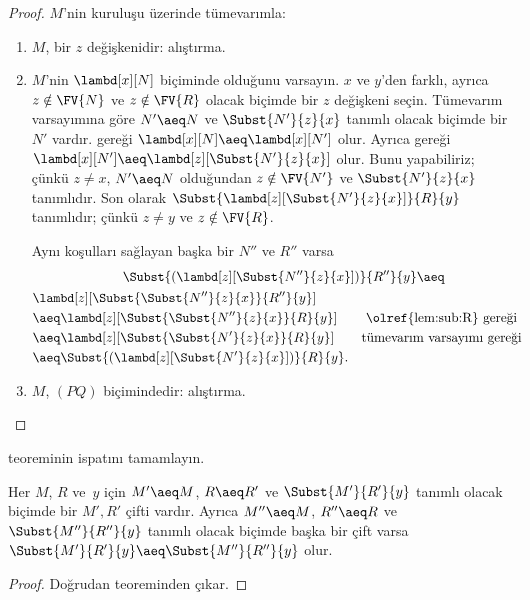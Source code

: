 \begin{proof}
  $M$'nin kuruluşu üzerinde tümevarımla:
  \begin{enumerate}
  \item $M$, bir $z$ değişkenidir: alıştırma.
  \item $M$'nin $\lambd[x][N]$ biçiminde olduğunu varsayın. $x$ ve $y$'den
    farklı, ayrıca $z\notin\FV{N}$ ve $z\notin\FV{R}$ olacak biçimde bir
    $z$ değişkeni seçin. Tümevarım varsayımına göre $N'\aeq N$ ve
    $\Subst{N'}{z}{x}$ tanımlı olacak biçimde bir $N'$ vardır.
     gereği
    $\lambd[x][N]\aeq\lambd[x][N']$ olur. Ayrıca
     gereği
    $\lambd[x][N']\aeq\lambd[z][\Subst{N'}{z}{x}]$ olur. Bunu yapabiliriz;
    çünkü $z\neq x$, $N'\aeq N$ olduğundan $z\notin\FV{N'}$ ve
    $\Subst{N'}{z}{x}$ tanımlıdır. Son olarak
    $\Subst{\lambd[z][\Subst{N'}{z}{x}]}{R}{y}$ tanımlıdır; çünkü
    $z\neq y$ ve $z\notin\FV{R}$.

    Aynı koşulları sağlayan başka bir $N''$ ve $R''$ varsa
    \begin{multline*}
      \Subst{(\lambd[z][\Subst{N''}{z}{x}])}{R''}{y} \aeq\\
    \begin{aligned}
      &\lambd[z][\Subst{\Subst{N''}{z}{x}}{R''}{y}] \\
      &\aeq \lambd[z][\Subst{\Subst{N''}{z}{x}}{R}{y}] && \text{
        \olref{lem:sub:R} gereği}\\
      &\aeq\lambd[z][\Subst{\Subst{N'}{z}{x}}{R}{y}]
      && \text{tümevarım varsayımı gereği}\\
      &\aeq\Subst{(\lambd[z][\Subst{N'}{z}{x}])}{R}{y}.
    \end{aligned}
    \end{multline*}
    \item $M$, $(PQ)$ biçimindedir: alıştırma.
  \end{enumerate}
\end{proof}

\begin{prob}
   teoreminin ispatını tamamlayın.
\end{prob}

\begin{cor}
  Her $M$, $R$ ve~$y$ için $M'\aeq M$, $R\aeq R'$ ve
  $\Subst{M'}{R'}{y}$ tanımlı olacak biçimde bir $M',R'$ çifti vardır.
  Ayrıca $M''\aeq M$, $R''\aeq R$ ve $\Subst{M''}{R''}{y}$ tanımlı olacak
  biçimde başka bir çift varsa
  $\Subst{M'}{R'}{y}\aeq\Subst{M''}{R''}{y}$ olur.
\end{cor}

\begin{proof}
  Doğrudan  teoreminden çıkar.
\end{proof}


